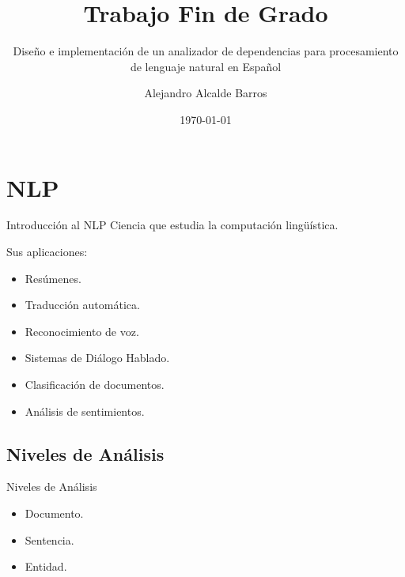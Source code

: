 \documentclass[utf8]{beamer}
\institute{ETSIIT}
\date{\today}
\title{Trabajo Fin de Grado} %
\subtitle{Diseño e implementación de un analizador de dependencias para procesamiento de lenguaje natural en Español} %
\author{Alejandro Alcalde Barros}
\begin{document}
\frame{\maketitle}

  \section{NLP}
  
  \begin{frame}[label=intro]{Introducción al NLP}
    Ciencia que estudia la computación lingüística.

    Sus aplicaciones:
    \begin{itemize}
    \item Resúmenes.
    \item Traducción automática.
    \item Reconocimiento de voz.
    \item Sistemas de Diálogo Hablado.
    \item Clasificación de documentos.
    \item Análisis de sentimientos.
    \end{itemize}
  \end{frame}

  \subsection{Niveles de Análisis}
  
  \begin{frame}{Niveles de Análisis}
    \begin{itemize}
    \item Documento.
    \item Sentencia.
    \item Entidad.
    \end{itemize}
  \end{frame}

  \newcommand*{\checktikz}[1][]{\tikz[x=1em, y=1em]\fill[#1] (0,.35) -- (.25,0) --
      (1,.7) -- (.25,.15) -- cycle;}
  \newcommand*{\ccheck}{\checktikz[tick,rounded corners=.5pt, draw=tick,
      thin]} %
\end{document}
